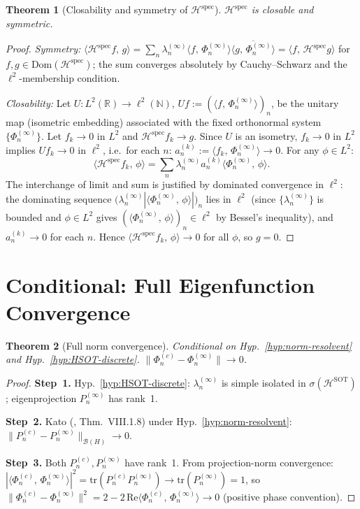 \documentclass[12pt,a4paper]{amsart}
\newtheorem{theorem}{Theorem}[section]
\theoremstyle{definition}
\theoremstyle{remark}
\newcommand{\ip}[2]{\langle #1,\, #2\rangle}
\newcommand{\Hspec}{\mathcal{H}^{\mathrm{spec}}}
\newcommand{\HSOT}{\mathcal{H}^{\mathrm{SOT}}}
\newcommand{\Dom}{\mathrm{Dom}}
\begin{document}
\begin{theorem}[Closability and symmetry of $\Hspec$]
\label{thm:closable-spec}
$\Hspec$ is closable and symmetric.
\end{theorem}

\begin{proof}
\textit{Symmetry:}
$\ip{\Hspec f}{g}
=\sum_n\lambda_n^{(\infty)}
\ip{f}{\Phi_n^{(\infty)}}\overline{\ip{g}{\Phi_n^{(\infty)}}}
=\ip{f}{\Hspec g}$
for $f,g\in\Dom(\Hspec)$;
the sum converges absolutely by
Cauchy--Schwarz and the $\ell^2$-membership condition.

\textit{Closability:}
Let $U\colon L^2(\mathbb{R})\to\ell^2(\mathbb{N})$,
$Uf:=(\ip{f}{\Phi_n^{(\infty)}})_n$,
be the unitary map (isometric embedding) associated
with the fixed orthonormal system $\{\Phi_n^{(\infty)}\}$.
Let $f_k\to 0$ in $L^2$ and $\Hspec f_k\to g$.
Since $U$ is an isometry,
$f_k\to 0$ in $L^2$ implies
$Uf_k\to 0$ in $\ell^2$,
i.e.\ for each $n$:
$a_n^{(k)}:=\ip{f_k}{\Phi_n^{(\infty)}}\to 0$.
For any $\phi\in L^2$:
\[
  \ip{\Hspec f_k}{\phi}
  =\sum_n\lambda_n^{(\infty)}
  a_n^{(k)}\ip{\Phi_n^{(\infty)}}{\phi}.
\]
The interchange of limit and sum is justified by
dominated convergence in $\ell^2$:
the dominating sequence
$\bigl(\lambda_n^{(\infty)}|\ip{\Phi_n^{(\infty)}}{\phi}|\bigr)_n$
lies in $\ell^2$
(since $\{\lambda_n^{(\infty)}\}$ is bounded and
$\phi\in L^2$ gives $(\ip{\Phi_n^{(\infty)}}{\phi})_n\in\ell^2$
by Bessel's inequality),
and $a_n^{(k)}\to 0$ for each $n$.
Hence $\ip{\Hspec f_k}{\phi}\to 0$ for all $\phi$,
so $g=0$.
\end{proof}

\section{Conditional: Full Eigenfunction Convergence}
\label{sec:phi-conv}

\begin{theorem}[Full norm convergence]
\label{thm:phi-conv}
\emph{Conditional on
Hyp.~\ref{hyp:norm-resolvent} and
Hyp.~\ref{hyp:HSOT-discrete}.}
$\|\Phi_n^{(c)}-\Phi_n^{(\infty)}\|\to 0$.
\end{theorem}

\begin{proof}
\textbf{Step~1.}
Hyp.~\ref{hyp:HSOT-discrete}: $\lambda_n^{(\infty)}$
is simple isolated in $\sigma(\HSOT)$;
eigenprojection $P_n^{(\infty)}$ has rank~1.

\textbf{Step~2.}
Kato (\cite{Kato1966}, Thm.~VIII.1.8) under
Hyp.~\ref{hyp:norm-resolvent}:
$\|P_n^{(c)}-P_n^{(\infty)}\|_{\mathcal{B}(H)}\to 0$.

\textbf{Step~3.}
Both $P_n^{(c)},P_n^{(\infty)}$ have rank~1.
From projection-norm convergence:
$|\ip{\Phi_n^{(c)}}{\Phi_n^{(\infty)}}|^2
=\mathrm{tr}(P_n^{(c)}P_n^{(\infty)})\to
\mathrm{tr}(P_n^{(\infty)})=1$,
so $\|\Phi_n^{(c)}-\Phi_n^{(\infty)}\|^2
=2-2\,\mathrm{Re}\ip{\Phi_n^{(c)}}{\Phi_n^{(\infty)}}\to 0$
(positive phase convention).
\end{proof}
\end{document}
